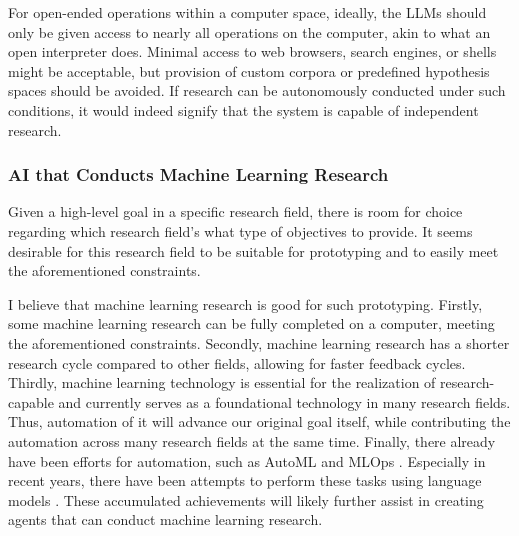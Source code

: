 For open-ended operations within a computer space, ideally, the LLMs should only be given access to nearly all operations on the computer, akin to what an open interpreter \cite{openinterpreter} does. Minimal access to web browsers, search engines, or shells might be acceptable, but provision of custom corpora or predefined hypothesis spaces should be avoided. If research can be autonomously conducted under such conditions, it would indeed signify that the system is capable of independent research.



\subsubsection{AI that Conducts Machine Learning Research}
Given a high-level goal in a specific research field, there is room for choice regarding which research field's what type of objectives to provide. It seems desirable for this research field to be suitable for prototyping and to easily meet the aforementioned constraints.

I believe that machine learning research is good for such prototyping. Firstly, some machine learning research can be fully completed on a computer, meeting the aforementioned constraints. Secondly, machine learning research has a shorter research cycle compared to other fields, allowing for faster feedback cycles. Thirdly, machine learning technology is essential for the realization of research-capable and currently serves as a foundational technology in many research fields. Thus, automation of it will advance our original goal itself, while contributing the automation across many research fields at the same time. Finally, there already have been efforts for automation, such as AutoML \cite{hutter2019automated,bischl2023hyperparameter,lindauer2020best,white2023neural} and MLOps \cite{kreuzberger2023machine}. Especially in recent years, there have been attempts to perform these tasks using language models \cite{vijay2023prompt,zheng2023can}. These accumulated achievements will likely further assist in creating agents that can conduct machine learning research.


